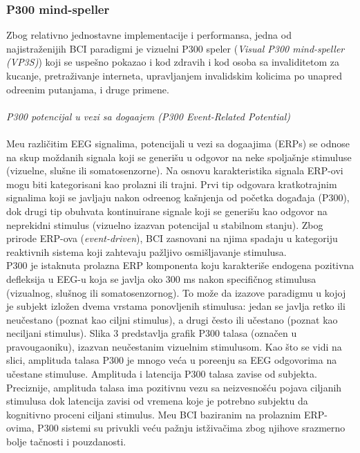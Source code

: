 \documentclass[conference]{IEEEtran}
\begin{document}
\subsubsection{P300 mind-speller}
Zbog relativno jednostavne implementacije i performansa, jedna od najistraženijih BCI paradigmi je vizuelni P300 speler (\textit{Visual P300 mind-speller (VP3S)}) koji se uspešno pokazao i kod zdravih i kod osoba sa invaliditetom za kucanje, pretraživanje interneta, upravljanjem invalidskim kolicima po unapred odre\dj enim putanjama, i druge primene.\\
\\
\textit{P300 potencijal u vezi sa doga\dj ajem (P300 Event-Related Potential)}\\
\\
Me\dj u različitim EEG signalima, potencijali u vezi sa doga\dj ajima (ERPs) se odnose na skup moždanih signala koji se generišu u odgovor na neke spoljašnje stimuluse (vizuelne, slušne ili somatosenzorne). Na osnovu karakteristika signala ERP-ovi mogu biti kategorisani kao prolazni ili trajni. Prvi tip odgovara kratkotrajnim signalima koji se javljaju nakon odre\dj enog kašnjenja od početka događaja (P300), dok drugi tip obuhvata kontinuirane signale koji se generišu kao odgovor na neprekidni stimulus (vizuelno izazvan potencijal u stabilnom stanju). Zbog prirode ERP-ova (\textit{event-driven}), BCI zasnovani na njima spadaju u kategoriju reaktivnih sistema koji zahtevaju pažljivo osmišljavanje stimulusa.\\
P300 je istaknuta prolazna ERP komponenta koju karakteriše endogena pozitivna defleksija u EEG-u koja se javlja oko 300 ms nakon specifičnog stimulusa (vizualnog, slušnog ili somatosenzornog). To može da izazove  paradigmu u kojoj je subjekt izložen dvema vrstama ponovljenih stimulusa: jedan se javlja retko ili neučestano (poznat kao ciljni stimulus), a drugi često ili učestano (poznat kao neciljani stimulus). Slika 3 predstavlja grafik P300 talasa (označen u pravougaoniku), izazvan neučestanim vizuelnim stimulusom. Kao što se vidi na slici, amplituda talasa P300 je mnogo veća u pore\dj enju sa EEG odgovorima na učestane stimuluse. Amplituda i latencija P300 talasa zavise od subjekta. Preciznije, amplituda talasa ima pozitivnu vezu sa neizvesnošću pojava ciljanih stimulusa dok latencija zavisi od vremena koje je potrebno subjektu da kognitivno proceni ciljani stimulus. Me\dj u BCI baziranim na prolaznim ERP-ovima, P300 sistemi su privukli veću pažnju istživačima zbog njihove srazmerno bolje tačnosti i pouzdanosti.\\
\end{document}
